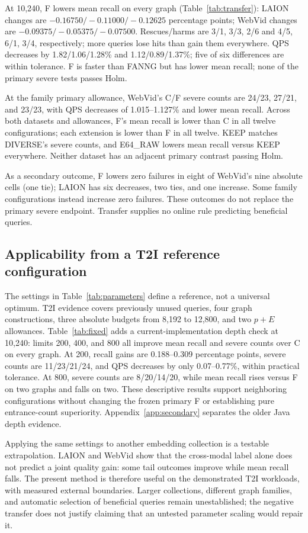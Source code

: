 

At 10,240, F lowers mean recall on every graph (Table~\ref{tab:transfer}): LAION changes are $-0.16750/-0.11000/-0.12625$ percentage points; WebVid changes are $-0.09375/-0.05375/-0.07500$. Rescues/harms are 3/1, 3/3, 2/6 and 4/5, 6/1, 3/4, respectively; more queries lose hits than gain them everywhere. QPS decreases by 1.82/1.06/1.28\% and 1.12/0.89/1.37\%; five of six differences are within tolerance. F is faster than FANNG but has lower mean recall; none of the primary severe tests passes Holm.

At the family primary allowance, WebVid's C/F severe counts are 24/23, 27/21, and 23/23, with QPS decreases of 1.015--1.127\% and lower mean recall. Across both datasets and allowances, F's mean recall is lower than C in all twelve configurations; each extension is lower than F in all twelve. KEEP matches DIVERSE's severe counts, and E64\_RAW lowers mean recall versus KEEP everywhere. Neither dataset has an adjacent primary contrast passing Holm.

As a secondary outcome, F lowers zero failures in eight of WebVid's nine absolute cells (one tie); LAION has six decreases, two ties, and one increase. Some family configurations instead increase zero failures. These outcomes do not replace the primary severe endpoint. Transfer supplies no online rule predicting beneficial queries.

\subsection{Applicability from a T2I reference configuration}\label{sec:scope}
The settings in Table~\ref{tab:parameters} define a reference, not a universal optimum. T2I evidence covers previously unused queries, four graph constructions, three absolute budgets from 8,192 to 12,800, and two $p+E$ allowances. Table~\ref{tab:fixed} adds a current-implementation depth check at 10,240: limits 200, 400, and 800 all improve mean recall and severe counts over C on every graph. At 200, recall gains are 0.188--0.309 percentage points, severe counts are 11/23/21/24, and QPS decreases by only 0.07--0.77\%, within practical tolerance. At 800, severe counts are 8/20/14/20, while mean recall rises versus F on two graphs and falls on two. These descriptive results support neighboring configurations without changing the frozen primary F or establishing pure entrance-count superiority. Appendix~\ref{app:secondary} separates the older Java depth evidence.

Applying the same settings to another embedding collection is a testable extrapolation. LAION and WebVid show that the cross-modal label alone does not predict a joint quality gain: some tail outcomes improve while mean recall falls. The present method is therefore useful on the demonstrated T2I workloads, with measured external boundaries. Larger collections, different graph families, and automatic selection of beneficial queries remain unestablished; the negative transfer does not justify claiming that an untested parameter scaling would repair it.

